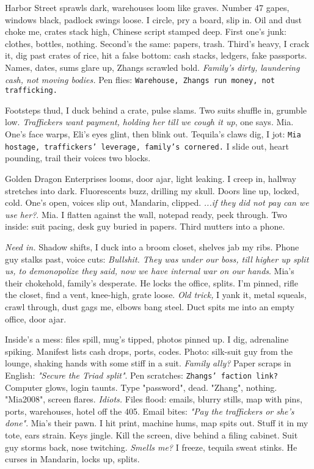 \documentclass[12pt,oneside]{book} %
\newcommand{\note}[1]{\texttt{#1}}
\begin{document}
Harbor Street sprawls dark, warehouses loom like graves. Number 47 gapes, windows black, padlock swings loose. I circle, pry a board, slip in. Oil and dust choke me, crates stack high, Chinese script stamped deep. First one’s junk: clothes, bottles, nothing. Second’s the same: papers, trash. Third’s heavy, I crack it, dig past crates of rice, hit a false bottom: cash stacks, ledgers, fake passports. Names, dates, sums glare up, Zhangs scrawled bold. \textit{Family’s dirty, laundering cash, not moving bodies.} Pen flies: \note{Warehouse, Zhangs run money, not trafficking.}

Footsteps thud, I duck behind a crate, pulse slams. Two suits shuffle in, grumble low. \textit{Traffickers want payment, holding her till we cough it up}, one says. Mia. One’s face warps, \textnormal{Eli}’s eyes glint, then blink out. Tequila’s claws dig, I jot: \note{Mia hostage, traffickers’ leverage, family’s cornered.} I slide out, heart pounding, trail their voices two blocks.

Golden Dragon Enterprises looms, door ajar, light leaking. I creep in, hallway stretches into dark. Fluorescents buzz, drilling my skull. Doors line up, locked, cold. One’s open, voices slip out, Mandarin, clipped. \textit{...if they did not pay can we use her?}. Mia. I flatten against the wall, notepad ready, peek through. Two inside: suit pacing, desk guy buried in papers. Third mutters into a phone.

\textit{Need in.} Shadow shifts, I duck into a broom closet, shelves jab my ribs. Phone guy stalks past, voice cuts: \textit{Bullshit. They was under our boss, till higher up split us, to demonopolize they said, now we have internal war on our hands}. Mia’s their chokehold, family’s desperate. He locks the office, splits. I’m pinned, rifle the closet, find a vent, knee-high, grate loose. \textit{Old trick,} I yank it, metal squeals, crawl through, dust gags me, elbows bang steel. Duct spits me into an empty office, door ajar.

Inside’s a mess: files spill, mug’s tipped, photos pinned up. I dig, adrenaline spiking. Manifest lists cash drops, ports, codes. Photo: silk-suit guy from the lounge, shaking hands with some stiff in a suit. \textit{Family ally?} Paper scraps in English: \textit{"Secure the Triad split"}. Pen scratches: \note{Zhangs’ faction link?} Computer glows, login taunts. Type "password", dead. "Zhang", nothing. "Mia2008", screen flares. \textit{Idiots.} Files flood: emails, blurry stills, map with pins, ports, warehouses, hotel off the 405. Email bites: \textit{"Pay the traffickers or she’s done"}. Mia’s their pawn. I hit print, machine hums, map spits out. Stuff it in my tote, ears strain. Keys jingle. Kill the screen, dive behind a filing cabinet. Suit guy storms back, nose twitching. \textit{Smells me?} I freeze, tequila sweat stinks. He curses in Mandarin, locks up, splits.
\end{document}

